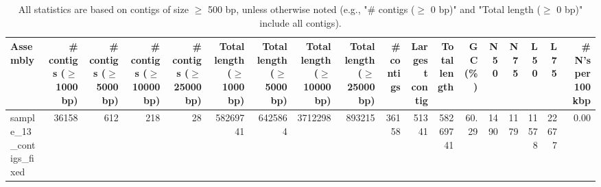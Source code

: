 \documentclass[12pt,a4paper]{article}
\begin{document}
\begin{table}[ht]
\begin{center}
\caption{All statistics are based on contigs of size $\geq$ 500 bp, unless otherwise noted (e.g., "\# contigs ($\geq$ 0 bp)" and "Total length ($\geq$ 0 bp)" include all contigs).}
\begin{tabular}{|l*{17}{|r}|}
\hline
Assembly & \# contigs ($\geq$ 1000 bp) & \# contigs ($\geq$ 5000 bp) & \# contigs ($\geq$ 10000 bp) & \# contigs ($\geq$ 25000 bp) & Total length ($\geq$ 1000 bp) & Total length ($\geq$ 5000 bp) & Total length ($\geq$ 10000 bp) & Total length ($\geq$ 25000 bp) & \# contigs & Largest contig & Total length & GC (\%) & N50 & N75 & L50 & L75 & \# N's per 100 kbp \\ \hline
sample\_13\_contigs\_fixed & 36158 & 612 & 218 & 28 & 58269741 & 6425864 & 3712298 & 893215 & 36158 & 51341 & 58269741 & 60.29 & 1490 & 1179 & 11578 & 22677 & 0.00 \\ \hline
\end{tabular}
\end{center}
\end{table}
\end{document}
